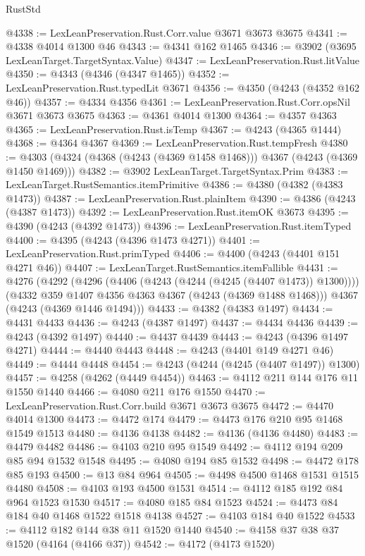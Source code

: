 \begin{lexlean}{RustStd}
\begin{coremodule}
@4338 := LexLeanPreservation.Rust.Corr.value @3671 @3673 @3675
@4341 := @4338 @4014 @1300 @46
@4343 := @4341 @162 @1465
@4346 := @3902 (@3695 LexLeanTarget.TargetSyntax.Value)
@4347 := LexLeanPreservation.Rust.litValue
@4350 := @4343 (@4346 (@4347 @1465))
@4352 := LexLeanPreservation.Rust.typedLit @3671
@4356 := @4350 (@4243 (@4352 @162 @46))
@4357 := @4334 @4356
@4361 := LexLeanPreservation.Rust.Corr.opsNil @3671 @3673 @3675
@4363 := @4361 @4014 @1300
@4364 := @4357 @4363
@4365 := LexLeanPreservation.Rust.isTemp
@4367 := @4243 (@4365 @1444)
@4368 := @4364 @4367
@4369 := LexLeanPreservation.Rust.tempFresh
@4380 := @4303 (@4324 (@4368 (@4243 (@4369 @1458 @1468))) @4367 (@4243 (@4369 @1450 @1469)))
@4382 := @3902 LexLeanTarget.TargetSyntax.Prim
@4383 := LexLeanTarget.RustSemantics.itemPrimitive
@4386 := @4380 (@4382 (@4383 @1473))
@4387 := LexLeanPreservation.Rust.plainItem
@4390 := @4386 (@4243 (@4387 @1473))
@4392 := LexLeanPreservation.Rust.itemOK @3673
@4395 := @4390 (@4243 (@4392 @1473))
@4396 := LexLeanPreservation.Rust.itemTyped
@4400 := @4395 (@4243 (@4396 @1473 @4271))
@4401 := LexLeanPreservation.Rust.primTyped
@4406 := @4400 (@4243 (@4401 @151 @4271 @46))
@4407 := LexLeanTarget.RustSemantics.itemFallible
@4431 := @4276
    (@4292
      (@4296 (@4406 (@4243 (@4244 (@4245 (@4407 @1473)) @1300))))
      (@4332 @359 @1407 @4356 @4363 @4367 (@4243 (@4369 @1488 @1468)))
      @4367
      (@4243 (@4369 @1446 @1494)))
@4433 := @4382 (@4383 @1497)
@4434 := @4431 @4433
@4436 := @4243 (@4387 @1497)
@4437 := @4434 @4436
@4439 := @4243 (@4392 @1497)
@4440 := @4437 @4439
@4443 := @4243 (@4396 @1497 @4271)
@4444 := @4440 @4443
@4448 := @4243 (@4401 @149 @4271 @46)
@4449 := @4444 @4448
@4454 := @4243 (@4244 (@4245 (@4407 @1497)) @1300)
@4457 := @4258 (@4262 (@4449 @4454))
@4463 := @4112 @211 @144 @176 @11 @1550 @1440
@4466 := @4080 @211 @176 @1550
@4470 := LexLeanPreservation.Rust.Corr.build @3671 @3673 @3675
@4472 := @4470 @4014 @1300
@4473 := @4472 @174
@4479 := @4473 @176 @210 @95 @1468 @1549 @1513
@4480 := @4136 @4138
@4482 := @4136 (@4136 @4480)
@4483 := @4479 @4482
@4486 := @4103 @210 @95 @1549
@4492 := @4112 @194 @209 @85 @94 @1532 @1548
@4495 := @4080 @194 @85 @1532
@4498 := @4472 @178 @85 @193
@4500 := @13 @84 @964
@4505 := @4498 @4500 @1468 @1531 @1515 @4480
@4508 := @4103 @193 @4500 @1531
@4514 := @4112 @185 @192 @84 @964 @1523 @1530
@4517 := @4080 @185 @84 @1523
@4524 := @4473 @84 @184 @40 @1468 @1522 @1518 @4138
@4527 := @4103 @184 @40 @1522
@4533 := @4112 @182 @144 @38 @11 @1520 @1440
@4540 := @4158 @37 @38 @37 @1520 (@4164 (@4166 @37))
@4542 := @4172 (@4173 @1520)

\end{coremodule}
\end{lexlean}
